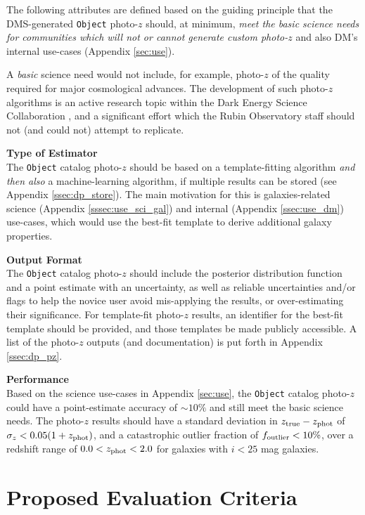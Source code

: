 \documentclass[DM,lsstdraft,toc]{lsstdoc}
\begin{document}
The following attributes are defined based on the guiding principle that the DMS-generated {\tt Object} photo-$z$ should, at minimum, {\it meet the basic science needs for communities which will not or cannot generate custom photo-$z$} and also DM's internal use-cases (Appendix \ref{sec:use}).

A {\it basic} science need would not include, for example, photo-$z$ of the quality required for major cosmological advances.
The development of such photo-$z$ algorithms is an active research topic within the Dark Energy Science Collaboration \citep{2018arXiv180901669T}, and a significant effort which the Rubin Observatory staff should not (and could not) attempt to replicate. 

{\bf Type of Estimator}\\
The {\tt Object} catalog photo-$z$ should be based on a template-fitting algorithm {\it and then also} a machine-learning algorithm, if multiple results can be stored (see Appendix \ref{ssec:dp_store}).
The main motivation for this is galaxies-related science (Appendix \ref{sssec:use_sci_gal}) and internal (Appendix \ref{ssec:use_dm}) use-cases, which would use the best-fit template to derive additional galaxy properties.

{\bf Output Format}\\
The {\tt Object} catalog photo-$z$ should include the posterior distribution function and a point estimate with an uncertainty, as well as reliable uncertainties and/or flags to help the novice user avoid mis-applying the results, or over-estimating their significance.
For template-fit photo-$z$ results, an identifier for the best-fit template should be provided, and those templates be made publicly accessible.
A list of the photo-$z$ outputs (and documentation) is put forth in Appendix \ref{ssec:dp_pz}.

{\bf Performance}\\
Based on the science use-cases in Appendix \ref{sec:use}, the {\tt Object} catalog photo-$z$ could have a point-estimate accuracy of $\sim10\%$ and still meet the basic science needs.
The photo-$z$ results should have a standard deviation in $z_{\rm true}-z_{\rm phot}$ of $\sigma_z < 0.05(1+z_{\rm phot})$, and a catastrophic outlier fraction of $f_{\rm outlier} < 10\%$, over a redshift range of $0.0 < z_{\rm phot} < 2.0$ for galaxies with $i<25$ mag galaxies.


\clearpage
\section{Proposed Evaluation Criteria} \label{sec:sel}
\end{document}
